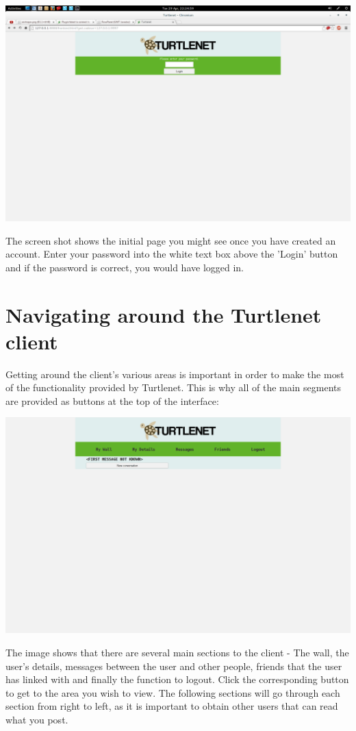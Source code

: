 \includegraphics[scale=0.2]{../Screenshots/Screenshot from 2014-04-29 22-24-59}

The screen shot shows the initial page you might see once you have created an
account.  Enter your password into the white text box above the 'Login' button
and if the password is correct, you would have logged in.

\section{Navigating around the Turtlenet client}
Getting around the client's various areas is important in order to make the most
of the functionality provided by Turtlenet.  This is why all of the main
segments are provided as buttons at the top of the interface:

\includegraphics[scale=0.2]{../Screenshots/Screenshot from 2014-04-29 22-31-38}

The image shows that there are several main sections to the client - The wall,
the user's details, messages between the user and other people, friends that the
user has linked with and finally the function to logout.  Click the
corresponding button to get to the area you wish to view.  The following
sections will go through each section from right to left, as it is important to
obtain other users that can read what you post.

